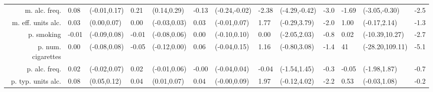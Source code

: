 \documentclass[a4paper]{article}
\begin{document}
\begin{table}
\begin{tabular}{rLlLlLlLlLLlL}
			m. alc.  freq. & 0.08 & (-0.01,0.17) & 0.21 & (0.14,0.29) & -0.13 & (-0.24,-0.02) & -2.38 & (-4.29,-0.42) & -3.0 & -1.69 & (-3.05,-0.30) & -2.5 \\
			m. eff. units alc. & 0.03 & (0.00,0.07) & 0.00 & (-0.03,0.03) & 0.03 & (-0.01,0.07) & 1.77 & (-0.29,3.79) & -2.0 & 1.00 & (-0.17,2.14) & -1.3 \\
			p. smoking & -0.01 & (-0.09,0.08) & -0.01 & (-0.08,0.06) & 0.00 & (-0.10,0.10) & 0.00 & (-2.05,2.03) & -0.8 & 0.02 & (-10.39,10.27) & -2.7 \\
			p. num. cigarettes & 0.00 & (-0.08,0.08) & -0.05 & (-0.12,0.00) & 0.06 & (-0.04,0.15) & 1.16 & (-0.80,3.08) & -1.4 & 41 & (-28.20,109.11) & -5.1 \\
			p. alc.  freq. & 0.02 & (-0.02,0.07) & 0.02 & (-0.01,0.06) & -0.00 & (-0.04,0.04) & -0.04 & (-1.54,1.45) & -0.3 & -0.05 & (-1.98,1.87) & -0.7 \\
			p. typ. units alc. & 0.08 & (0.05,0.12) & 0.04 & (0.01,0.07) & 0.04 & (-0.00,0.09) & 1.97 & (-0.12,4.02) & -2.2 & 0.53 & (-0.03,1.08) & -0.2 \\
			
			\hline
		\end{tabular}
		
	\end{table}
	
\end{document}
